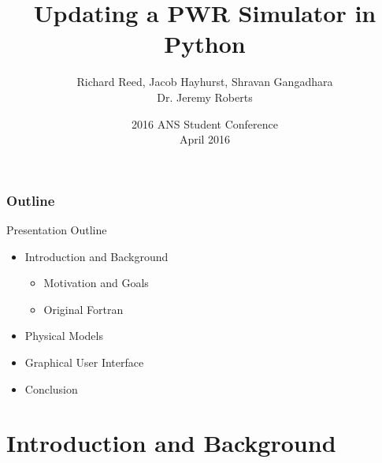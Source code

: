 \documentclass[fleqn]{beamer}
\title[Updating PWR Simulator]{
    Updating a PWR Simulator in Python}
\author[Reed, Hayhurst]{
    Richard Reed, Jacob Hayhurst, Shravan Gangadhara \\
    Dr. Jeremy Roberts}
\institute[Kansas State University]{
    Mechanical and Nuclear Engineering \\
    Kansas State University}
\date[2016 Student Conference]{
    2016 ANS Student Conference \\
    April 2016}
\begin{document}
    \newcommand{\beginbackup}{
        \newcounter{framenumbervorappendix}
        \setcounter{framenumbervorappendix}{\value{framenumber}}
    }
    \newcommand{\backupend}{
        \addtocounter{framenumbervorappendix}{-\value{framenumber}}
        \addtocounter{framenumber}{\value{framenumbervorappendix}} 
    }
    
    \begin{frame}
        \titlepage
    \end{frame}
    
    \begin{frame}
        \frametitle{Outline}
        \begin{block}{Presentation Outline}
            \begin{itemize}
                \item Introduction and Background
                \begin{itemize}
                    \item Motivation and Goals
                    \item Original Fortran
                \end{itemize}
                \item Physical Models
                \item Graphical User Interface
                \item Conclusion
            \end{itemize}
        \end{block}
    \end{frame}
    
    \section{Introduction and Background}
    
\end{document}

